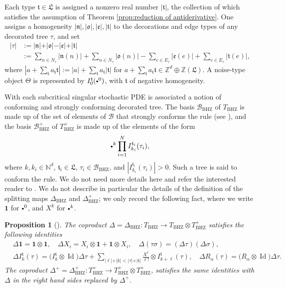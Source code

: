 \documentclass[10pt]{amsart}
\newcommand{\sbullet}{{\scriptscriptstyle\bullet}}
\newcommand{\scbullet}{{\raisebox{1pt}{$\sbullet$}}}
\theoremstyle{plain}
\newtheorem{prop}[thm]{Proposition}
\theoremstyle{definition}
\DeclareMathOperator{\iden}{Id}
\newcommand{\unit}{\mathbf{1}}
\newcommand{\BHZ}{{\scriptscriptstyle\mathrm{BHZ}}}
\newcommand{\bsmcB}{\boldsymbol{\mathcal{B}}}
\newcommand{\frkL}{\mathfrak{L}}
\newcommand{\frkt}{\mathfrak{t}}
\newcommand{\frkn}{\mathfrak{n}}
\newcommand{\frko}{\mathfrak{o}}
\newcommand{\frke}{\mathfrak{e}}
\newcommand{\bbN}{\mathbb{N}}
\newcommand{\bbZ}{\mathbb{Z}}
\newcommand{\mcB}{\mathcal{B}}
\begin{document}
Each type $\frkt\in\frkL$ is assigned a nonzero real number $|\frkt|$, the collection of which satisfies the assumption of Theorem \ref{prop:reduction of antiderivative}. One assigns a homogeneity $\vert\frkn\vert, \vert\frko\vert, \vert\frke\vert, \vert\frkt\vert$ to the decorations and edge types of any decorated tree $\tau$, and set
\begin{align*}
\vert\tau\vert &:= \vert\frkn\vert + \vert\frko\vert - \vert\frke\vert + \vert\frkt\vert\\
&:=\sum_{n\in N_\tau}|\frkn(n)|+\sum_{n\in N_\tau}|\frko(n)|-\sum_{e\in E_\tau}|\frke(e)|+\sum_{e\in E_\tau}|\frkt(e)|,
\end{align*}
where $|a+\sum_{\frkt}a_\frkt\frkt|:=|a|+\sum_{\frkt}a_\frkt|\frkt|$ for $a+\sum_{\frkt}a_{\frkt}\frkt\in\bbZ^d\oplus\bbZ(\frkL)$.
A noise-type object $\Theta$ is represented by $I_0^{\frkt}(\scbullet^0)$, with $\frkt$ of negative homogeneity.

With each subcritical singular stochastic PDE is associated a notion of conforming and strongly conforming decorated tree. The basis $\mcB_{\BHZ}$ of $T_{\BHZ}$ is made up of the set of elements of $\bsmcB$ that strongly conforms the rule (see \cite[\S5]{BHZ}), and the basis $\mcB_{\BHZ}^+$ of $T_{\BHZ}^+$ is made up of the elements of the form
\[
\scbullet^k\prod_{i=1}^NI_{k_i}^{\frkt_i}(\tau_i),
\]
where $k,k_i\in\bbN^d$, $\frkt_i\in\frkL$, $\tau_i\in\mcB_{\BHZ}$, and $|I_{k_i}^{\frkt_i}(\tau_i)|>0$.
Such a tree is said to conform the rule. We do not need more details here and refer the interested reader to \cite[\S5]{BHZ}. We do not describe in particular the details of the definition of the splitting maps $\Delta_\BHZ$ and $\Delta^+_\BHZ$; we only record the following fact, where we write $\unit$ for $\scbullet^0$, and $X^k$ for $\scbullet^k$.

\begin{prop}[{\cite[Prop.\,4.17]{BHZ}}]\label{recursive def of Delta}
The coproduct $\Delta=\Delta_{\BHZ}:T_\BHZ\to T_\BHZ\otimes T^+_\BHZ$ satisfies the following identities
\begin{align*}
&\Delta\unit=\unit\otimes\unit,\quad \Delta X_i=X_i\otimes\unit+\unit\otimes X_i,\quad \Delta(\tau\sigma)=(\Delta\tau)(\Delta\sigma), \\
&\Delta I_k^\frkt(\tau) = \bigl(I_k^\frkt\otimes\iden\bigr)\Delta\tau + \sum_{\vert\ell\vert+\vert k\vert <\vert \tau\vert+\vert\frkt\vert}\frac{X^\ell}{\ell!}\otimes I_{k+\ell}^\frkt(\tau),\quad
\Delta R_\alpha(\tau) = \bigl(R_\alpha\otimes\iden\bigr)\Delta\tau.
\end{align*}
The coproduct $\Delta^+=\Delta_{\BHZ}^+:T^+_\BHZ\to T^+_\BHZ\otimes T^+_\BHZ$, satisfies the same identities with $\Delta$ in the right hand sides replaced by $\Delta^+$.
\end{prop}
\end{document}
